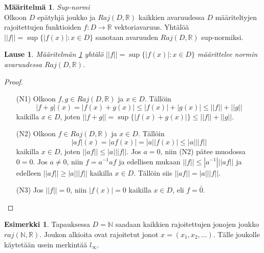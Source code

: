\documentclass[12pt,a4paper,leqno]{report}
\newcommand{\R}{\mathbb{R}}
\newcommand{\N}{\mathbb{N}}
\theoremstyle{plain}
\newtheorem{lause}[equation]{Lause}
\theoremstyle{definition}
\newtheorem{maar}[equation]{Määritelmä}
\newtheorem{esim}[equation]{Esimerkki}
\theoremstyle{remark}
\begin{document}
\begin{maar}\label{sup-normi} \emph{Sup-normi}\\
Olkoon $D$ epätyhjä joukko ja $Raj(D,\R )$ kaikkien avaruudessa $D$ määriteltyjen rajoitettujen funktioiden $f\colon D\rightarrow \R$ vektoriavaruus. 
Yhtälöä $||f||=\sup\{|f(x)|\colon x\in D\}$ sanotaan avaruuden $Raj(D,\R )$ sup-normiksi.
\end{maar} 
\begin{lause}
Määritelmän \ref{sup-normi} yhtälö $||f||=\sup\{|f(x)|\colon x\in D\}$ määrittelee normin avaruudessa $Raj(D,\R )$. %

\end{lause} 

\begin{proof}
\begin{itemize}
\item[(N1)] Olkoon $f,g\in Raj(D,\R )$ ja $x\in D$. Tällöin
\begin{equation*}
|f+g|(x)=|f(x)+g(x)|\leq|f(x)|+|g(x)|\leq||f||+||g||
\end{equation*}
kaikilla $x\in D$, joten $||f+g||=\sup\{|f(x)+g(x)|\}\leq||f||+||g||$.

\item[(N2)] Olkoon $f\in Raj(D,\R )$ ja $x\in D$. Tällöin
\begin{equation*}
|af|(x)=|af(x)|=|a||f(x)|\leq|a|||f||
\end{equation*}
kaikilla $x\in D$, joten $||af||\leq|a|||f||$. Jos $a=0$, niin (N2) pätee muodossa $0=0$. %
Jos $a\neq 0$, niin $f=a^{-1}af$ ja edellisen
mukaan $||f||\leq|a^{-1}|||af||$
ja edelleen $||af||\geq|a|||f||$ kaikilla $x\in D$. Tällöin siis $||af||=|a|||f||$.

\item[(N3)]Jos $||f||=0$, niin $|f(x)|=0$ kaikilla $x\in D$, eli  $f=\bar{0}$.
\end{itemize} 
\end{proof}

\begin{esim}
Tapauksessa $D=\N$ saadaan kaikkien rajoitettujen jonojen joukko $raj(\N,\R).$ Joukon alkioita ovat rajoitetut jonot $x=(x_1,x_2,\dots).$ Tälle joukolle käytetään usein merkintää $l_\infty$.

\end{esim}
\end{document}
